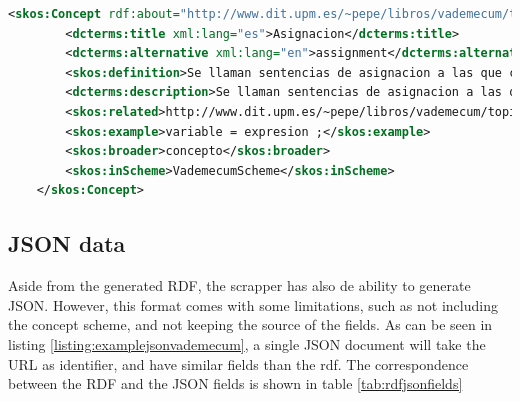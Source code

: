 \begin{center} 
  \begin{lstlisting}[language=XML, captionpos=b, caption=Example extractor, label=listing:examplerdfvademecum]   
    <skos:Concept rdf:about="http://www.dit.upm.es/~pepe/libros/vademecum/topics/26.html">
        <dcterms:title xml:lang="es">Asignacion</dcterms:title>
        <dcterms:alternative xml:lang="en">assignment</dcterms:alternative>
        <skos:definition>Se llaman sentencias de asignacion a las que cargan un nuevo valor en una variable</skos:definition>
        <dcterms:description>Se llaman sentencias de asignacion a las que cargan un nuevo valor en una variable: El tipo de la variable debe ser igual al de la expresion en tipos primitivos: asignable por promocion (ver \" Promocion\") asignable por reduccion (ver \" Reduccion\") en objetos: asignable por Upcasting (ver \"Casting\") asignable por Downcasting (ver \"Casting\")</dcterms:description>
        <skos:related>http://www.dit.upm.es/~pepe/libros/vademecum/topics/122.html</skos:related> <skos:related>http://www.dit.upm.es/~pepe/libros/vademecum/topics/242.html</skos:related> <skos:related>http://www.dit.upm.es/~pepe/libros/vademecum/topics/247.html</skos:related> <skos:related>http://www.dit.upm.es/~pepe/libros/vademecum/topics/288.html</skos:related> <skos:related>http://www.dit.upm.es/~pepe/libros/vademecum/topics/47.html</skos:related> <skos:related>http://www.dit.upm.es/~pepe/libros/vademecum/topics/86.html</skos:related> <skos:related>http://www.dit.upm.es/~pepe/libros/vademecum/topics/47.html</skos:related> <skos:related>http://www.dit.upm.es/~pepe/libros/vademecum/topics/3.html</skos:related> <skos:related>http://www.dit.upm.es/~pepe/libros/vademecum/topics/27.html</skos:related> <skos:related>http://www.dit.upm.es/~pepe/libros/vademecum/topics/28.html</skos:related> 
        <skos:example>variable = expresion ;</skos:example>
        <skos:broader>concepto</skos:broader>        
        <skos:inScheme>VademecumScheme</skos:inScheme>
    </skos:Concept>
 \end{lstlisting}
\end{center}


\subsection{JSON data}

Aside from the generated RDF, the scrapper has also de ability to generate JSON. However, this format comes with some limitations, such as not including the concept scheme, and not keeping the source of the fields. As can be seen in listing \ref{listing:examplejsonvademecum}, a single JSON document will take the URL as identifier, and have similar fields than the rdf. The correspondence between the RDF and the JSON fields is shown in table \ref{tab:rdfjsonfields}


